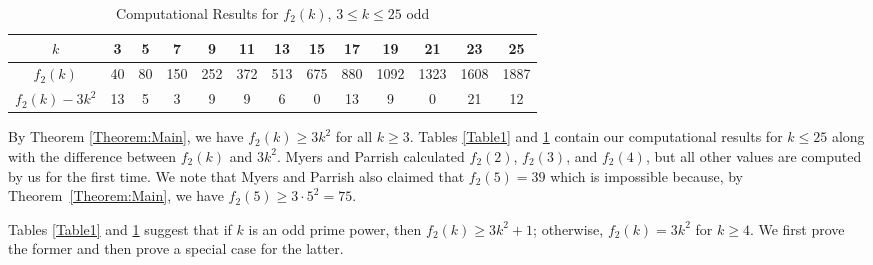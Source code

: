 \documentclass[11pt]{article}
\theoremstyle{definition}
\begin{document}
\begin{table}[H]
\renewcommand{\arraystretch}{1.5}
\centering
\begin{tabular}{|c|c|c|c|c|c|c|c|c|c|c|c|c|}
\hline
$k$&3&5&7&9&11&13&15&17&19&21&23&25\\\hline
$f_2(k)$&40&80&150&252&372&513&675&880&1092&1323&1608&1887\\\hline
$f_2(k)-3k^2$&13&5&3&9&9&6&0&13&9&0&21&12\\\hline
\end{tabular}
\caption{Computational Results for $f_2(k)$, $3\leq k\leq 25$ odd}\label{Table2}
\end{table}

By Theorem \ref{Theorem:Main}, we have $f_2(k)\geq3k^2$ for all $k\geq3$. Tables \ref{Table1} and \ref{Table2} contain our computational results for $k\leq 25$ along with the difference between $f_2(k)$ and $3k^2$. Myers and Parrish \cite{MyersParrish2018} calculated $f_2(2)$, $f_2(3)$, and $f_2(4)$, but all other values are computed by us for the first time. We note that Myers and Parrish \cite[Computation 21 on Page 12]{MyersParrish2018} also claimed that $f_2(5)=39$ which is impossible because, by Theorem~\ref{Theorem:Main}, we have $f_2(5)\geq3\cdot5^2=75$. 

Tables \ref{Table1} and \ref{Table2} suggest that if $k$ is an odd prime power, then $f_2(k)\geq3k^2+1$; otherwise, $f_2(k)=3k^2$ for $k\geq4$. We first prove the former and then prove a special case for the latter.
\end{document}
